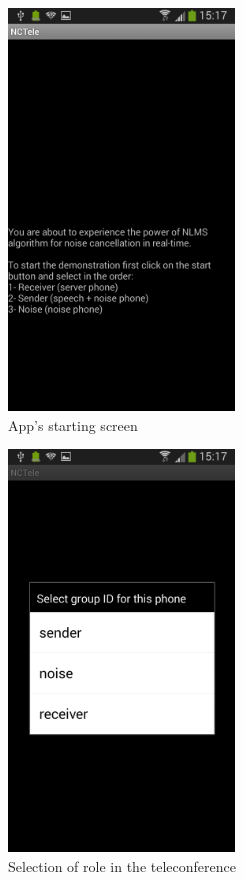 \documentclass[11pt,a4paper,english]{book}  %
\theoremstyle{definition}  %
\theoremstyle{plain}  %
\theoremstyle{remark}  %
\begin{document}
		\begin{figure}[h]
		\centering
		\includegraphics[width=6cm]{images/android/startingscreen.jpg}
		\caption{App's starting screen}
		\label{fig:starting}
		\end{figure}
		
		
		\begin{figure}[h]
		\centering
		\includegraphics[width=6cm]{images/android/selectionscreen.jpg}
		\caption{Selection of role in the teleconference}
		\label{fig:selection}
		\end{figure}
			
		
		
\end{document}
